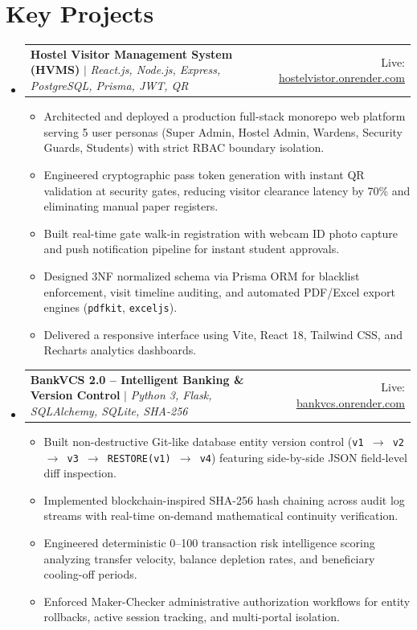 \documentclass[letterpaper,11pt]{article}
\makeatletter
\newcommand{\resumeItem}[1]{
  \item\small{
    {#1 \vspace{-2pt}}
  }
}
\newcommand{\resumeProjectHeading}[2]{
    \item
    \begin{tabular*}{0.97\textwidth}{l@{\extracolsep{\fill}}r}
      \small#1 & #2 \\
    \end{tabular*}\vspace{-7pt}
}
\newcommand{\resumeSubHeadingListStart}{\begin{itemize}[leftmargin=0.15in, label={}]}
\newcommand{\resumeSubHeadingListEnd}{\end{itemize}}
\newcommand{\resumeItemListStart}{\begin{itemize}}
\newcommand{\resumeItemListEnd}{\end{itemize}\vspace{-5pt}}
\makeatother
\begin{document}
\section{Key Projects}
    \resumeSubHeadingListStart
      \resumeProjectHeading
          {\textbf{Hostel Visitor Management System (HVMS)} $|$ \emph{React.js, Node.js, Express, PostgreSQL, Prisma, JWT, QR}}{Live: \href{https://hostelvistor.onrender.com/login}{\underline{hostelvistor.onrender.com}}}
          \resumeItemListStart
            \resumeItem{Architected and deployed a production full-stack monorepo web platform serving 5 user personas (Super Admin, Hostel Admin, Wardens, Security Guards, Students) with strict RBAC boundary isolation.}
            \resumeItem{Engineered cryptographic pass token generation with instant QR validation at security gates, reducing visitor clearance latency by 70\% and eliminating manual paper registers.}
            \resumeItem{Built real-time gate walk-in registration with webcam ID photo capture and push notification pipeline for instant student approvals.}
            \resumeItem{Designed 3NF normalized schema via Prisma ORM for blacklist enforcement, visit timeline auditing, and automated PDF/Excel export engines (\texttt{pdfkit}, \texttt{exceljs}).}
            \resumeItem{Delivered a responsive interface using Vite, React 18, Tailwind CSS, and Recharts analytics dashboards.}
          \resumeItemListEnd

      \resumeProjectHeading
          {\textbf{BankVCS 2.0 -- Intelligent Banking \& Version Control} $|$ \emph{Python 3, Flask, SQLAlchemy, SQLite, SHA-256}}{Live: \href{https://banking-application-version-control-4.onrender.com/}{\underline{bankvcs.onrender.com}}}
          \resumeItemListStart
            \resumeItem{Built non-destructive Git-like database entity version control (\texttt{v1 $\rightarrow$ v2 $\rightarrow$ v3 $\rightarrow$ RESTORE(v1) $\rightarrow$ v4}) featuring side-by-side JSON field-level diff inspection.}
            \resumeItem{Implemented blockchain-inspired SHA-256 hash chaining across audit log streams with real-time on-demand mathematical continuity verification.}
            \resumeItem{Engineered deterministic 0--100 transaction risk intelligence scoring analyzing transfer velocity, balance depletion rates, and beneficiary cooling-off periods.}
            \resumeItem{Enforced Maker-Checker administrative authorization workflows for entity rollbacks, active session tracking, and multi-portal isolation.}
          \resumeItemListEnd
    \resumeSubHeadingListEnd
\end{document}
